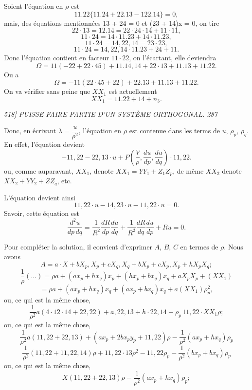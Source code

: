 \documentclass[11pt,a4paper]{book}
\begin{document}
Soient l'\'equation en $\rho$ est
\[
11. 22\{11. 24 + 22. 13 - 122. 14\} = 0,
\]
mais, des \'equations mentionn\'ees 13 + 24 = 0 et (23 + 14)x = 0, on tire
\[
22 \cdot 13 = 12. 14 = 22 \cdot 24 \cdot 14 + 11 \cdot 11,
\]
\[
11 \cdot 24 = 14 \cdot 11. 23 + 14 \cdot 11. 23,
\]
\[
11 \cdot 24 = 14, 22, 14 = 23 \cdot 23,
\]
\[
11 \cdot 24 = 14, 22, 14 \cdot 11. 23 + 24 + 11.
\]
Donc l'\'equation contient en facteur $11 \cdot 22$, on l'\'ecartant, elle deviendra
\[
\Omega = 11(- 22 + 22 \cdot 45) + 11. 14, 14 + 22 \cdot 13 + 11. 13 + 11. 22.
\]
Ou a
\[
\Omega = -11(22 \cdot 45 + 22) + 22. 13 + 11. 13 + 11. 22.
\]
On va v\'erifier sans peine que $XX_1$ est actuellement
\[
XX_1 = 11. 22 + 14 + n_3.
\]

\clearpage

\noindent\textit{518] \hfill PUISSE FAIRE PARTIE D'UN SYST\`EME ORTHOGONAL. \hfill 287}

\medskip

Donc, en \'ecrivant $\lambda = \dfrac{u}{\rho^2}$, l'\'equation en $\rho$ est contenue dans les terms de $u$, $\rho_p$, $\rho_q$.
En effet, l'\'equation devient
\[
- 11, 22 - 22, 13 \cdot u + P\left(\frac{V}{\rho}, \frac{du}{dp}, \frac{du}{dq}\right) \cdot 11, 22.
\]
ou, comme auparavant, $XX_1$, denote $XX_1 = YY_1 + Z_1 Z_p$, de m\^eme $XX_2$ denote
$XX_2 + YY_2 + Z Z_q$, etc.

L'\'equation devient ainsi
\[
11, 22 \cdot u - 14, 23 \cdot u - 11, 22 \cdot u = 0.
\]
Savoir, cette \'equation est
\[
\frac{d^2 u}{dp\,dq} = \frac{1}{R^2}\frac{dR}{dp}\frac{du}{dq} + \frac{1}{R^2}\frac{dR}{dq}\frac{du}{dp} + R u = 0.
\]

Pour compl\'eter la solution, il convient d'exprimer $A$, $B$, $C$ en termes de $\rho$. Nous
avons
\[
A = a \cdot X + b X_p, X_p + c X_q, X_q + b X_p + c X_p, X_p + h X_p X_q ;
\]
\[
\frac{1}{\rho}(\ldots) = \rho a + (a x_p + h x_q) x_p + (h x_p + b x_q) x_q + a X_p X_p + (XX_1)
\]
\[
= \rho a + (a x_p + h x_q) x_q + (a x_p + b x_q) x_q + a (XX_1)\rho_p^2,
\]
ou, ce qui est la m\^eme chose,
\[
\frac{1}{\rho^2} a (4 \cdot 12 \cdot 14 + 22, 22) + a, 22, 13 + h \cdot 22, 14 - \rho_p \, 11, 22 \cdot XX_1\rho;
\]
ou, ce qui est la m\^eme chose,
\[
\frac{1}{\rho^2} a (11, 22 + 22, 13) + (a x_p + 2 b x_p y_p + 11, 22) \rho - \frac{1}{\rho^2}(a x_p + h x_q)\rho_p
\]
\[
\frac{1}{\rho^2}(11, 22 + 11, 22, 14)\rho + 11, 22 \cdot 13\rho^2 - 11, 22\rho_p - \frac{1}{\rho^2}(b x_p + b x_q)\rho_p
\]
ou, ce qui est la m\^eme chose,
\[
X(11, 22 + 22, 13)\rho - \frac{1}{\rho^2}(a x_p + h x_q)\rho_p ;
\]
\end{document}
